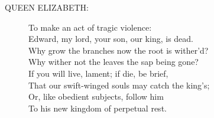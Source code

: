 \documentclass{article}
\begin{document}
\begin{description}
\item[QUEEN ELIZABETH:] 
\hspace{1pt}To make an act of tragic violence:\\
\hspace{1pt}Edward, my lord, your son, our king, is dead.\\
\hspace{1pt}Why grow the branches now the root is wither'd?\\
\hspace{1pt}Why wither not the leaves the sap being gone?\\
\hspace{1pt}If you will live, lament; if die, be brief,\\
\hspace{1pt}That our swift-winged souls may catch the king's;\\
\hspace{1pt}Or, like obedient subjects, follow him\\
\hspace{1pt}To his new kingdom of perpetual rest.\\
\end{description}
\end{document}
